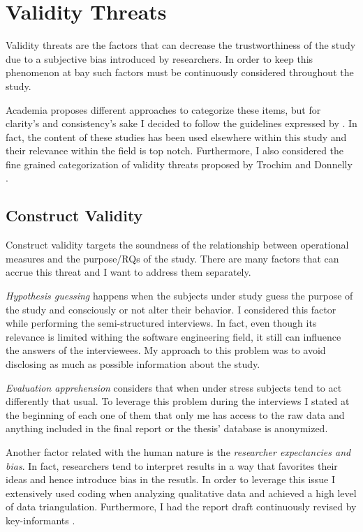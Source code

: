 \chapter{Validity Threats} \label{validity_threats}

Validity threats are the factors that can decrease the trustworthiness of the study due to a subjective bias introduced by researchers. In order to keep this phenomenon at bay such factors must be continuously considered throughout the study.

Academia proposes different approaches to categorize these items, but for clarity's and consistency's sake I decided to follow the guidelines expressed by \cite{case_study_guide,case_study_software_engineering}. In fact, the content of these studies has been used elsewhere within this study and their relevance within the field is top notch. Furthermore, I also considered the fine grained categorization of validity threats proposed by Trochim and Donnelly \cite{validity_threats}.

\section{Construct Validity}
Construct validity targets the soundness of the relationship between operational measures and the purpose/RQs of the study. There are many factors that can accrue this threat and I want to address them separately.


    \textit{Hypothesis guessing} happens when the subjects under study guess the purpose of the study and consciously or not alter their behavior. I considered this factor while performing the semi-structured interviews. In fact, even though its relevance is limited withing the software engineering field, it still can influence the answers of the interviewees. My approach to this problem was to avoid disclosing as much as possible information about the study.
    
    \textit{Evaluation apprehension} considers that when under stress subjects tend to act differently that usual. To leverage this problem during the interviews I stated at the beginning of each one of them that only me has access to the raw data and anything included in the final report or the thesis' database is anonymized.
    
    Another factor related with the human nature is the \textit{researcher expectancies and bias}. In fact, researchers tend to interpret results in a way that favorites their ideas and hence introduce bias in the resutls. In order to leverage this issue I extensively used coding when analyzing qualitative data and achieved a high level of data triangulation. Furthermore, I had the report draft continuously revised by key-informants \cite{case_study_guide}.
    

